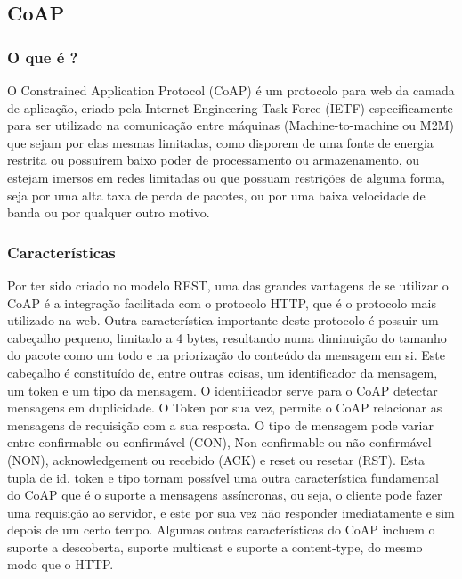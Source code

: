 \subsection{CoAP}

\subsubsection*{O que é ?}
O Constrained Application Protocol (CoAP) é um protocolo para web da camada de aplicação, criado pela Internet Engineering Task Force (IETF)  especificamente para ser utilizado na comunicação entre máquinas (Machine-to-machine ou M2M) que sejam por elas mesmas limitadas, como disporem de uma fonte de energia restrita ou possuírem baixo poder de processamento ou armazenamento, ou estejam imersos em redes limitadas ou que possuam restrições de alguma forma, seja por uma alta taxa de perda de pacotes, ou por uma baixa velocidade de banda ou por qualquer outro motivo.	

\subsubsection*{Características}
Por ter sido criado no modelo REST, uma das grandes vantagens de se utilizar o CoAP é a integração facilitada com o protocolo HTTP, que é o protocolo mais utilizado na web. Outra característica importante deste protocolo é possuir um cabeçalho pequeno, limitado a 4 bytes, resultando numa diminuição do tamanho do pacote como um todo e na priorização do conteúdo da mensagem em si. Este cabeçalho é constituído de, entre outras coisas, um identificador da mensagem, um token e um tipo da mensagem. O identificador serve para o CoAP detectar mensagens em duplicidade. O Token por sua vez, permite o CoAP relacionar as mensagens de requisição com a sua resposta. O tipo de mensagem pode variar entre confirmable ou confirmável (CON), Non-confirmable ou não-confirmável (NON), acknowledgement ou recebido (ACK) e reset ou resetar (RST). Esta tupla de id, token e tipo tornam possível uma outra característica fundamental do CoAP que é o suporte a mensagens assíncronas, ou seja, o cliente pode fazer uma requisição ao servidor, e este por sua vez não responder imediatamente e sim depois de um certo tempo. Algumas outras características do CoAP incluem o suporte a descoberta, suporte multicast e suporte a content-type, do mesmo modo que o HTTP. 

